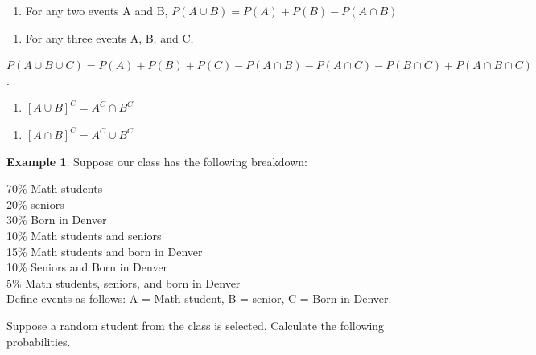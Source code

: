 \documentclass[
  11pt,
  oneside]{book}
\providecommand{\tightlist}{%
  \setlength{\itemsep}{0pt}\setlength{\parskip}{0pt}}
\theoremstyle{definition}
\theoremstyle{definition}
\newtheorem{example}{Example}[chapter]
\theoremstyle{definition}
\theoremstyle{definition}
\theoremstyle{remark}
\begin{document}
\vfill

\begin{enumerate}
\def\labelenumi{\arabic{enumi}.}
\setcounter{enumi}{4}
\tightlist
\item
  For any two events A and B,
  \(P(A \cup B) = P(A) + P(B) - P(A \cap B)\)
\end{enumerate}

\vfill

\begin{enumerate}
\def\labelenumi{\arabic{enumi}.}
\setcounter{enumi}{5}
\tightlist
\item
  For any three events A, B, and C,
\end{enumerate}

\(P(A \cup B \cup C) = P(A) + P(B) + P(C) - P(A \cap B) - P(A \cap C) - P(B \cap C) + P(A \cap B \cap C)\).

\vfill

\begin{enumerate}
\def\labelenumi{\arabic{enumi}.}
\setcounter{enumi}{6}
\tightlist
\item
  \(\left[A \cup B\right]^C = A^C \cap B^C\)
\end{enumerate}

\vfill

\begin{enumerate}
\def\labelenumi{\arabic{enumi}.}
\setcounter{enumi}{7}
\tightlist
\item
  \(\left[A \cap B\right]^C = A^C \cup B^C\)
\end{enumerate}

\newpage

\begin{example}
Suppose our class has the following breakdown:

70\% Math students\\
20\% seniors\\
30\% Born in Denver\\
10\% Math students and seniors\\
15\% Math students and born in Denver\\
10\% Seniors and Born in Denver\\
5\% Math students, seniors, and born in Denver\\

Define events as follows: A = Math student, B = senior, C = Born in Denver.

Suppose a random student from the class is selected. Calculate the following probabilities.
\end{example}
\end{document}
